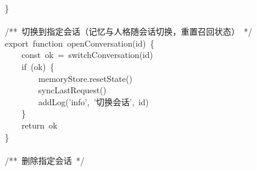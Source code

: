 \documentclass[a4paper,10pt]{article}
\begin{document}
{\}\\
\mbox{}\\
/**~切换到指定会话（记忆与人格随会话切换，重置召回状态）~*/\\
export~function~openConversation(id)~\{\\
~~~~const~ok~=~switchConversation(id)\\
~~~~if~(ok)~\{\\
~~~~~~~~memoryStore.resetState()\\
~~~~~~~~syncLastRequest()\\
~~~~~~~~addLog('info',~'切换会话',~id)\\
~~~~\}\\
~~~~return~ok\\
\}\\
\mbox{}\\
/**~删除指定会话~*/
}

\newpage
\end{document}
